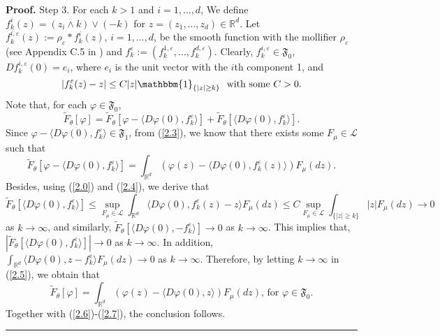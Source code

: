 \documentclass[a4paper,oneside,10pt]{article}%
\newenvironment{proof}[1][Proof]{\noindent \textbf{#1.} }{\  \rule{0.5em}{0.5em}}
\numberwithin{equation}{section}
\begin{document}
\begin{proof}
Step 3. For each $k>1$ and $i=1,\ldots,d$, We define $f_{k}^{i}(z)=(z_{i}%
\wedge k)\vee(-k)$ for $z=(z_{1},\ldots,z_{d})\in \mathbb{R}^{d}$. Let
$f_{k}^{i,\varepsilon}(z):=\rho_{\varepsilon}\ast f_{k}^{i}(z)$,
$i=1,\ldots,d$, be the smooth function with the mollifier $\rho_{\varepsilon}$
(see Appendix C.5 in \cite{E2010}) and $f_{k}^{\varepsilon}:=(f_{k}%
^{1,\varepsilon},\ldots,f_{k}^{d,\varepsilon})$. Clearly, $f_{k}%
^{i,\varepsilon}\in \mathfrak{F}_{0}$, $Df_{k}^{i,\varepsilon}(0)=e_{i}$, where
$e_{i}$ is the unit vector with the $i$th component 1, and
\begin{equation}
|f_{k}^{\varepsilon}(z)-z|\leq C|z|\mathbbm{1}_{\{|z|\geq k\}}\text{ \ with
some }C>0. \label{2.4}%
\end{equation}
Note that, for each $\varphi \in \mathfrak{F}_{0}$,
\begin{equation}
\tilde{F}_{\theta}[\varphi]=\tilde{F}_{\theta}[\varphi-\langle D\varphi
(0),f_{k}^{\varepsilon}\rangle]+\tilde{F}_{\theta}[\langle D\varphi
(0),f_{k}^{\varepsilon}\rangle]. \label{2.5}%
\end{equation}
Since $\varphi-\langle D\varphi(0),f_{k}^{\varepsilon}\rangle \in
\mathfrak{F}_{1}$, from (\ref{2.3}), we know that there exists some $F_{\mu
}\in \mathcal{L}$ such that
\[
\tilde{F}_{\theta}[\varphi-\langle D\varphi(0),f_{k}^{\varepsilon}%
\rangle]=\int_{\mathbb{R}^{d}}(\varphi(z)-\langle D\varphi(0),f_{k}%
^{\varepsilon}(z)\rangle)F_{\mu}(dz).
\]
Besides, using (\ref{2.0}) and (\ref{2.4}), we derive that%
\[
\tilde{F}_{\theta}[\langle D\varphi(0),f_{k}^{\varepsilon}\rangle]\leq
\sup \limits_{F_{\mu}\in \mathcal{L}}\int_{\mathbb{R}^{d}}\langle D\varphi
(0),f_{k}^{\varepsilon}(z)-z\rangle F_{\mu}(dz)\leq C\sup \limits_{F_{\mu}%
\in \mathcal{L}}\int_{\{|z|\geq k\}}|z|F_{\mu}(dz)\rightarrow0
\]
as $k\rightarrow \infty$, and similarly, $\tilde{F}_{\theta}[\langle
D\varphi(0),-f_{k}^{\varepsilon}\rangle]\rightarrow0$ as $k\rightarrow \infty$.
This implies that, $|\tilde{F}_{\theta}[\langle D\varphi(0),f_{k}%
^{\varepsilon}\rangle]|\rightarrow0$ as $k\rightarrow \infty$. In addition,
$\int_{\mathbb{R}^{d}}\langle D\varphi(0),z-f_{k}^{\varepsilon}\rangle F_{\mu
}(dz)\rightarrow0$ as $k\rightarrow \infty$. Therefore, by letting
$k\rightarrow \infty$ in (\ref{2.5}), we obtain that
\begin{equation}
\tilde{F}_{\theta}[\varphi]=\int_{\mathbb{R}^{d}}(\varphi(z)-\langle
D\varphi(0),z\rangle)F_{\mu}(dz)\text{, for }\varphi \in \mathfrak{F}_{0}.
\label{2.8}%
\end{equation}
Together with (\ref{2.6})-(\ref{2.7}), the conclusion follows.
\end{proof}
\end{document}
